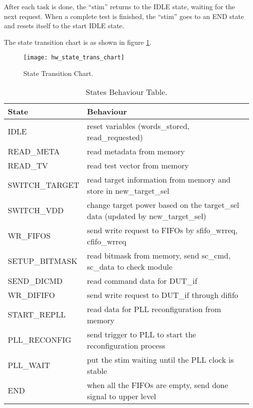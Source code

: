 After each task is done, the ``stim'' returns to the IDLE state, waiting for the next request. When a complete test is finished, the ``stim'' goes to an END state and resets itself to the start IDLE state.

The state transition chart is as shown in figure \ref{fig:hw_state_trans_chart}.

\begin{figure}
 \centering
 \texttt{[image: hw\_state\_trans\_chart]}
 \caption{State Transition Chart.}
 \label{fig:hw_state_trans_chart}
\end{figure}

\begin{table}[ht]
\centering
\begin{tabular}{|l|p{}|}
\hline
State & Behaviour \\
\hline
IDLE & reset variables (words\_stored, read\_requested) \\
READ\_META & read metadata from memory \\
READ\_TV & read test vector from memory \\
SWITCH\_TARGET & read target information from memory and store in new\_target\_sel \\
SWITCH\_VDD & change target power based on the target\_sel data (updated by new\_target\_sel) \\
WR\_FIFOS & send write request to FIFOs by sfifo\_wrreq, cfifo\_wrreq \\
SETUP\_BITMASK & read bitmask from memory, send sc\_cmd, sc\_data to check module \\
SEND\_DICMD & read command data for DUT\_if \\
WR\_DIFIFO & send write request to DUT\_if through dififo \\
START\_REPLL & read data for PLL reconfiguration from memory \\
PLL\_RECONFIG & send trigger to PLL to start the reconfiguration process \\
PLL\_WAIT & put the stim waiting until the PLL clock is stable \\
END & when all the FIFOs are empty, send done signal to upper level \\
\hline
\end{tabular}
\caption{States Behaviour Table.}
\label{tab:states_behaviour}
\end{table}

